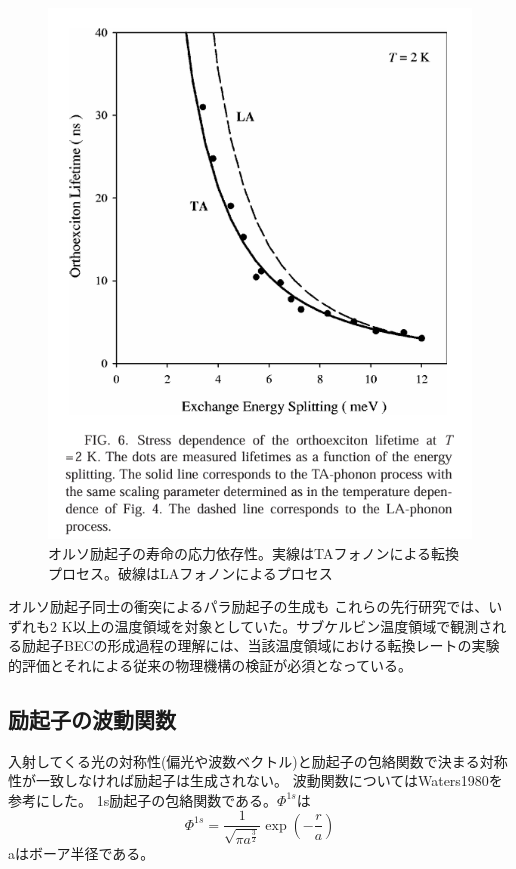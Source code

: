\begin{figure}[htbp]
\begin{center}
\begin{minipage}[b]{0.45\textwidth}
\includegraphics[width=\textwidth]{ScreenShoot_2024-07-22_174432.jpeg}
\caption{オルソ励起子の寿命の応力依存性。実線はTAフォノンによる転換プロセス。破線はLAフォノンによるプロセス}
\end{minipage}
\end{center}
\end{figure}

オルソ励起子同士の衝突によるパラ励起子の生成も
これらの先行研究では、いずれも2 K以上の温度領域を対象としていた。サブケルビン温度領域で観測される励起子BECの形成過程の理解には、当該温度領域における転換レートの実験的評価とそれによる従来の物理機構の検証が必須となっている。
\subsection{励起子の波動関数}
入射してくる光の対称性(偏光や波数ベクトル)と励起子の包絡関数で決まる対称性が一致しなければ励起子は生成されない。
波動関数についてはWaters1980を参考にした。
1s励起子の包絡関数である。$\Phi^{1s}$は
\[
\Phi^{1s} = \frac{1}{\sqrt{\pi a^\frac{3}{2}}} \exp\left( -\frac{r}{a} \right)
\]
aはボーア半径である。


